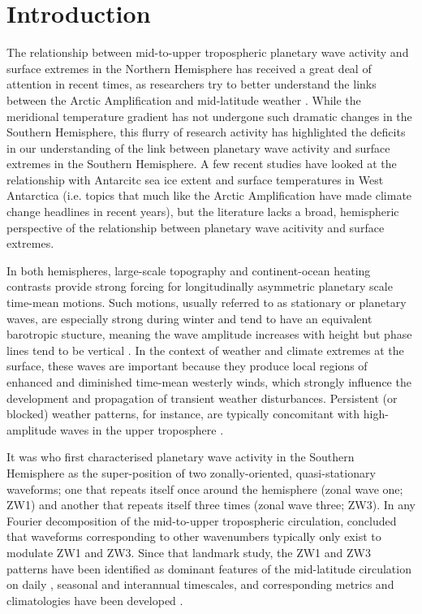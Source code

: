 \section{Introduction}\label{s:introduction}

The relationship between mid-to-upper tropospheric planetary wave activity and surface extremes in the Northern Hemisphere has received a great deal of attention in recent times, as researchers try to better understand the links between the Arctic Amplification and mid-latitude weather \citep[e.g.][]{Cohen2014,Screen2014}. While the meridional temperature gradient has not undergone such dramatic changes in the Southern Hemisphere, this flurry of research activity has highlighted the deficits in our understanding of the link between planetary wave activity and surface extremes in the Southern Hemisphere. A few recent studies have looked at the relationship with Antarcitc sea ice extent \citep{Raphael2007,Raphael2014} and surface temperatures in West Antarctica \citep{Ding2011,Ding2013} (i.e. topics that much like the Arctic Amplification have made climate change headlines in recent years), but the literature lacks a broad, hemispheric perspective of the relationship between planetary wave acitivity and surface extremes. 

In both hemispheres, large-scale topography and continent-ocean heating contrasts provide strong forcing for longitudinally asymmetric planetary scale time-mean motions. Such motions, usually referred to as stationary or planetary waves, are especially strong during winter and tend to have an equivalent barotropic stucture, meaning the wave amplitude increases with height but phase lines tend to be vertical \citep{Holton2013}. In the context of weather and climate extremes at the surface, these waves are important because they produce local regions of enhanced and diminished time-mean westerly winds, which strongly influence the development and propagation of transient weather disturbances. Persistent (or blocked) weather patterns, for instance, are typically concomitant with high-amplitude waves in the upper troposphere \citep[e.g.][]{Trenberth1985,Renwick2005}.

It was \citet{vanLoon1972} who first characterised planetary wave activity in the Southern Hemisphere as the super-position of two zonally-oriented, quasi-stationary waveforms; one that repeats itself once around the hemisphere (zonal wave one; ZW1) and another that repeats itself three times (zonal wave three; ZW3). In any Fourier decomposition of the mid-to-upper tropospheric circulation, \citet{vanLoon1972} concluded that waveforms corresponding to other wavenumbers typically only exist to modulate ZW1 and ZW3. Since that landmark study, the ZW1 and ZW3 patterns have been identified as dominant features of the mid-latitude circulation on daily , seasonal \citep[e.g.][]{Mo1985} and interannual \citep[e.g.][]{Karoly1989} timescales, and corresponding metrics and climatologies have been developed \citep{Raphael2004,Hobbs2007}.

